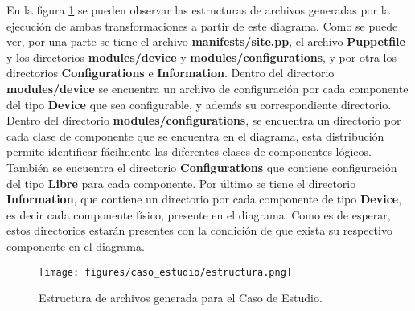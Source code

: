 En la figura \ref{fig:caso_estudio:estructura} se pueden observar las
estructuras de archivos generadas por la ejecución de ambas
transformaciones a partir de este diagrama. Como se puede ver, por una
parte se tiene el archivo \textbf{manifests/site.pp}, el archivo
\textbf{Puppetfile} y los directorios \textbf{modules/device} y
\textbf{modules/configurations}, y por otra los directorios
\textbf{Configurations} e \textbf{Information}. Dentro del directorio
\textbf{modules/device} se encuentra un archivo de configuración por
cada componente del tipo \textbf{Device} que sea configurable, y
además su correspondiente directorio. Dentro del directorio
\textbf{modules/configurations}, se encuentra un directorio por cada
clase de componente que se encuentra en el diagrama, esta distribución
permite identificar fácilmente las diferentes clases de componentes
lógicos. También se encuentra el directorio \textbf{Configurations} que
contiene configuración del tipo \textbf{Libre} para cada
componente. Por último se tiene el directorio \textbf{Information},
que contiene un directorio por cada componente de tipo
\textbf{Device}, es decir cada componente físico, presente en el
diagrama. Como es de esperar, estos directorios estarán presentes con
la condición de que exista su respectivo componente en el diagrama.

\begin{figure}[htbp]
    \centering
    \texttt{[image: figures/caso\_estudio/estructura.png]}
    \caption{Estructura de archivos generada para el Caso de Estudio.}
    \label{fig:caso_estudio:estructura}
\end{figure}

